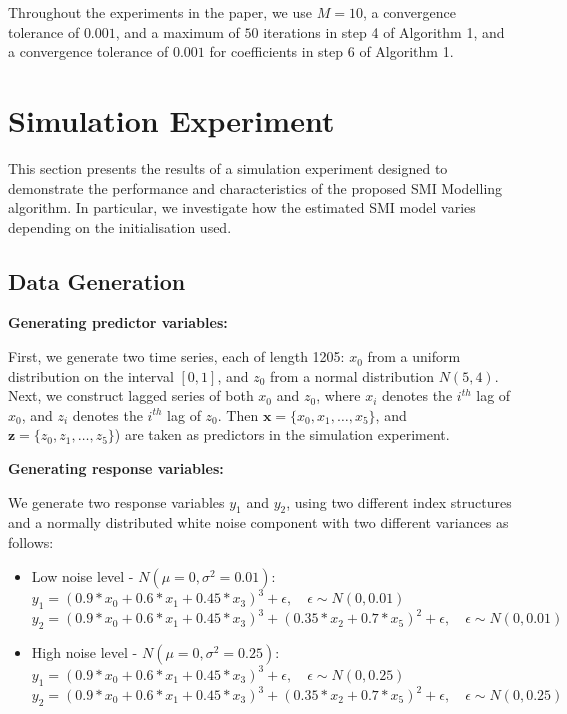\documentclass[
  11pt,
  a4paper,
]{article}
\begin{document}
Throughout the experiments in the paper, we use \(M = 10\), a
convergence tolerance of \(0.001\), and a maximum of \(50\) iterations
in step 4 of Algorithm 1, and a convergence tolerance of \(0.001\) for
coefficients in step 6 of Algorithm 1.

\section{Simulation Experiment}\label{sec-simulation}

This section presents the results of a simulation experiment designed to
demonstrate the performance and characteristics of the proposed SMI
Modelling algorithm. In particular, we investigate how the estimated SMI
model varies depending on the initialisation used.

\subsection{Data Generation}\label{sec-datagen}

\textbf{Generating predictor variables:}

First, we generate two time series, each of length 1205: \(x_{0}\) from
a uniform distribution on the interval \([0, 1]\), and \(z_{0}\) from a
normal distribution \(N(5, 4)\). Next, we construct lagged series of
both \(x_{0}\) and \(z_{0}\), where \(x_i\) denotes the \(i^{th}\) lag
of \(x_{0}\), and \(z_i\) denotes the \(i^{th}\) lag of \(z_{0}\). Then
\(\bm{x} = \{x_{0}, x_{1}, \dots, x_{5}\}\), and
\(\bm{z} = \{z_{0}, z_{1}, \dots, z_{5}\}\)) are taken as predictors in
the simulation experiment.

\textbf{Generating response variables:}

We generate two response variables \(y_{1}\) and \(y_{2}\), using two
different index structures and a normally distributed white noise
component with two different variances as follows:

\begin{itemize}
\item
  Low noise level - \(N(\mu = 0, \sigma^2 = 0.01)\):\\
  \(y_{1} = (0.9*x_{0} + 0.6*x_{1} + 0.45*x_{3})^3 + \epsilon, \quad \epsilon\sim N(0, 0.01)\)\\
  \(y_{2} = (0.9*x_{0} + 0.6*x_{1} + 0.45*x_{3})^3 + (0.35*x_{2} + 0.7*x_{5})^2 + \epsilon, \quad \epsilon\sim N(0, 0.01)\)
\item
  High noise level - \(N(\mu = 0, \sigma^2 = 0.25)\):\\
  \(y_{1} = (0.9*x_{0} + 0.6*x_{1} + 0.45*x_{3})^3 + \epsilon, \quad \epsilon\sim N(0, 0.25)\)\\
  \(y_{2} = (0.9*x_{0} + 0.6*x_{1} + 0.45*x_{3})^3 + (0.35*x_{2} + 0.7*x_{5})^2 + \epsilon, \quad \epsilon\sim N(0, 0.25)\)
\end{itemize}
\end{document}

